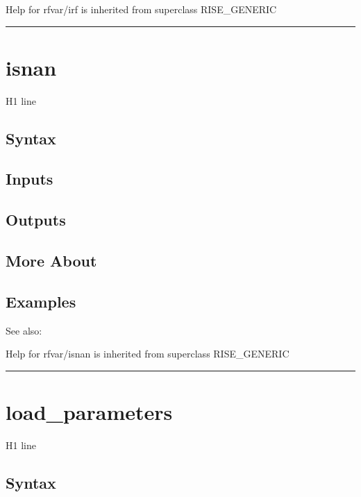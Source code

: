 \documentclass[letterpaper,10pt,english]{sphinxmanual}
\begin{document}
Help for rfvar/irf is inherited from superclass RISE\_GENERIC


\bigskip\hrule{}\bigskip



\section{isnan}
\label{classes/models/@rfvar/rfvar:isnan}\label{classes/models/@rfvar/rfvar:id43}
H1 line


\subsection{Syntax}
\label{classes/models/@rfvar/rfvar:id44}

\subsection{Inputs}
\label{classes/models/@rfvar/rfvar:id45}

\subsection{Outputs}
\label{classes/models/@rfvar/rfvar:id46}

\subsection{More About}
\label{classes/models/@rfvar/rfvar:id47}

\subsection{Examples}
\label{classes/models/@rfvar/rfvar:id48}
See also:

Help for rfvar/isnan is inherited from superclass RISE\_GENERIC


\bigskip\hrule{}\bigskip



\section{load\_parameters}
\label{classes/models/@rfvar/rfvar:id49}\label{classes/models/@rfvar/rfvar:load-parameters}
H1 line


\subsection{Syntax}
\label{classes/models/@rfvar/rfvar:id50}
\end{document}
